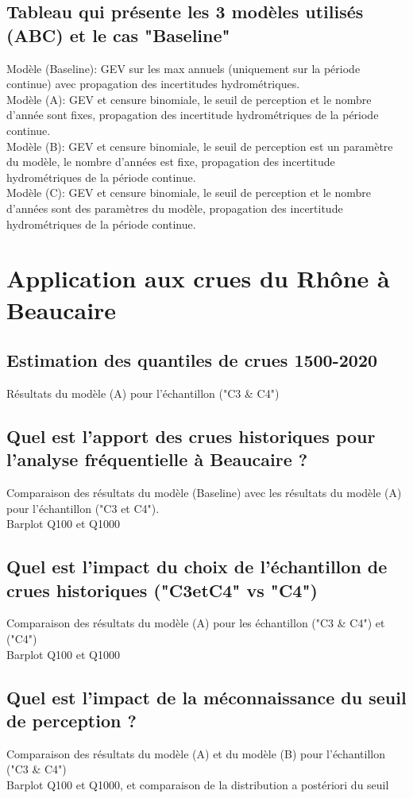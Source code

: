\documentclass[11pt]{article}
\begin{document}
	
	\subsection{Tableau qui présente les 3 modèles utilisés (ABC) et le cas "Baseline"}
	Modèle (Baseline): GEV sur les max annuels (uniquement sur la période continue) avec propagation des incertitudes hydrométriques.\\
		Modèle (A): GEV et censure binomiale, le seuil de perception et le nombre d'année sont fixes, propagation des incertitude hydrométriques de la période continue.\\
		Modèle (B): GEV et censure binomiale, le seuil de perception est un paramètre du modèle, le nombre d'années est fixe, propagation des incertitude hydrométriques de la période continue.\\
		Modèle (C): GEV et censure binomiale, le seuil de perception et le nombre d'années sont des paramètres du modèle, propagation des incertitude hydrométriques de la période continue.\\
		
	
\section{Application aux crues du Rhône à Beaucaire}	
	\subsection{Estimation des quantiles de crues 1500-2020}
	Résultats du modèle (A) pour l'échantillon ("C3 \& C4")
	
	\subsection{Quel est l'apport des crues historiques pour l'analyse fréquentielle à Beaucaire ?}
	Comparaison des résultats du modèle (Baseline) avec les résultats du modèle (A) pour l'échantillon ("C3 et C4").\\
	Barplot Q100 et Q1000
	
	\subsection{Quel est l'impact du choix de l'échantillon de crues historiques ("C3etC4" vs "C4")}
	Comparaison des résultats du modèle (A) pour les échantillon ("C3 \& C4") et ("C4")\\
	Barplot Q100 et Q1000	
	
	\subsection{Quel est l'impact de la méconnaissance du seuil de perception ?}
	Comparaison des résultats du modèle (A) et du modèle (B) pour l'échantillon ("C3 \& C4")\\
	Barplot Q100 et Q1000, et comparaison de la distribution a postériori du seuil
	
\end{document}
